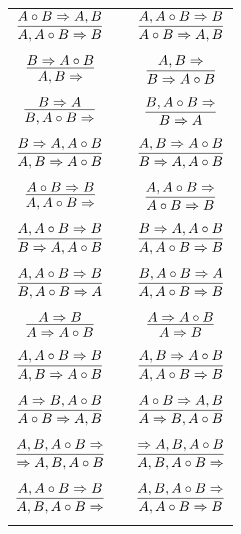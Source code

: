 \documentclass[11pt]{article}
\begin{document}
\begin{center}
\begin{tabular}{ccc}
$\infer{A, A\circ B\Rightarrow B}{A\circ B\Rightarrow A, B}$ && $\infer{A\circ B\Rightarrow A, B}{A, A\circ B\Rightarrow B}$ \\
&& \\
$\infer{A, B\Rightarrow }{B\Rightarrow A\circ B}$ && $\infer{B\Rightarrow A\circ B}{A, B\Rightarrow }$ \\
&& \\
$\infer{B, A\circ B\Rightarrow }{B\Rightarrow A}$ && $\infer{B\Rightarrow A}{B, A\circ B\Rightarrow }$ \\
&& \\
$\infer{A, B\Rightarrow A\circ B}{B\Rightarrow A, A\circ B}$ && $\infer{B\Rightarrow A, A\circ B}{A, B\Rightarrow A\circ B}$ \\
&& \\
$\infer{A, A\circ B\Rightarrow }{A\circ B\Rightarrow B}$ && $\infer{A\circ B\Rightarrow B}{A, A\circ B\Rightarrow }$ \\
&& \\
$\infer{B\Rightarrow A, A\circ B}{A, A\circ B\Rightarrow B}$ && $\infer{A, A\circ B\Rightarrow B}{B\Rightarrow A, A\circ B}$ \\
&& \\
$\infer{B, A\circ B\Rightarrow A}{A, A\circ B\Rightarrow B}$ && $\infer{A, A\circ B\Rightarrow B}{B, A\circ B\Rightarrow A}$ \\
&& \\
$\infer{A\Rightarrow A\circ B}{A\Rightarrow B}$ && $\infer{A\Rightarrow B}{A\Rightarrow A\circ B}$ \\
&& \\
$\infer{A, B\Rightarrow A\circ B}{A, A\circ B\Rightarrow B}$ && $\infer{A, A\circ B\Rightarrow B}{A, B\Rightarrow A\circ B}$ \\
&& \\
$\infer{A\circ B\Rightarrow A, B}{A\Rightarrow B, A\circ B}$ && $\infer{A\Rightarrow B, A\circ B}{A\circ B\Rightarrow A, B}$ \\
&& \\
$\infer{\Rightarrow A, B, A\circ B}{A, B, A\circ B\Rightarrow }$ && $\infer{A, B, A\circ B\Rightarrow }{\Rightarrow A, B, A\circ B}$ \\
&& \\
$\infer{A, B, A\circ B\Rightarrow }{A, A\circ B\Rightarrow B}$ && $\infer{A, A\circ B\Rightarrow B}{A, B, A\circ B\Rightarrow }$ \\
&& \\

\end{tabular}
\end{center}
\end{document}
